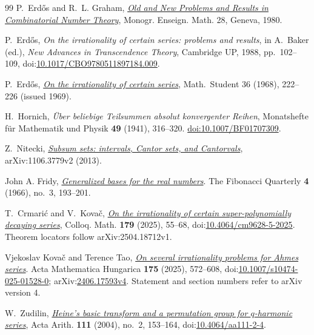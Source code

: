\documentclass[11pt]{article}
\begin{document}
\begin{thebibliography}{99}
 P.~Erd\H{o}s and R.~L. Graham,
  \href{https://mathweb.ucsd.edu/~ronspubs/80_11_number_theory.pdf}{\emph{Old
  and New Problems and Results in Combinatorial Number Theory}},
  Monogr. Enseign. Math. 28, Geneva, 1980.

 P.~Erd\H{o}s, \emph{On the irrationality of certain series:
  problems and results}, in A.~Baker (ed.), \emph{New Advances in Transcendence
  Theory}, Cambridge UP, 1988, pp.~102--109,
  doi:\href{https://doi.org/10.1017/CBO9780511897184.009}{10.1017/CBO9780511897184.009}.

 P.~Erd\H{o}s,
  \href{https://users.renyi.hu/~p_erdos/1969-09.pdf}{\emph{On the
  irrationality of certain series}}, Math.\ Student 36 (1968), 222--226
  (issued 1969).

H.~Hornich,
\emph{\"Uber beliebige Teilsummen absolut konvergenter Reihen},
Monatshefte f\"ur Mathematik und Physik \textbf{49} (1941), 316--320.
\href{https://doi.org/10.1007/BF01707309}{doi:10.1007/BF01707309}.

 Z.~Nitecki,
  \href{https://arxiv.org/abs/1106.3779v2}{\emph{Subsum sets: intervals, Cantor
  sets, and Cantorvals}}, arXiv:1106.3779v2 (2013).

 John A. Fridy, \href{https://www.fq.math.ca/Scanned/4-3/fridy.pdf}{\emph{Generalized bases for the real numbers}}.
  The Fibonacci Quarterly \textbf{4} (1966), no.~3, 193--201.

 T.~Crmari\'{c} and V.~Kova\v{c},
  \href{https://arxiv.org/abs/2504.18712v1}
  {\emph{On the irrationality of certain super-polynomially decaying series}},
  Colloq. Math. \textbf{179} (2025), 55--68,
  doi:\href{https://doi.org/10.4064/cm9628-5-2025}{10.4064/cm9628-5-2025}.
  Theorem locators follow arXiv:2504.18712v1.

 Vjekoslav Kova\v{c} and Terence Tao, \href{https://arxiv.org/abs/2406.17593v4}{\emph{On several irrationality problems for Ahmes series}}.
  Acta Mathematica Hungarica \textbf{175} (2025), 572--608, doi:\href{https://doi.org/10.1007/s10474-025-01528-0}{10.1007/s10474-025-01528-0}; arXiv:\href{https://arxiv.org/abs/2406.17593v4}{2406.17593v4}. Statement and section numbers refer to arXiv version 4.

 W.~Zudilin,
  \href{https://geodesic.mathdoc.fr/articles/10.4064/aa111-2-4/}{\emph{Heine's
  basic transform and a permutation group for \(q\)-harmonic series}},
  Acta Arith. \textbf{111} (2004), no.~2, 153--164,
  doi:\href{https://doi.org/10.4064/aa111-2-4}{10.4064/aa111-2-4}.


\end{thebibliography}
\end{document}
